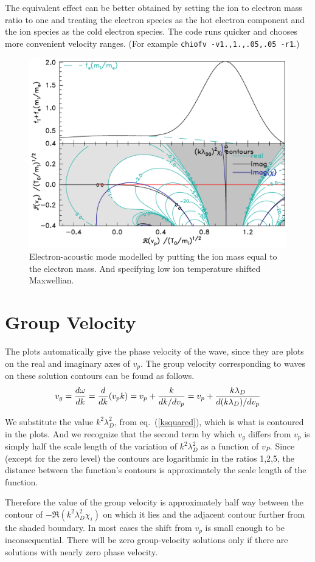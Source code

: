 \documentclass[12pt]{article}
\begin{document}
The equivalent effect can be better obtained by setting the ion to
electron mass ratio to one and treating the electron species as the
hot electron component and the ion species as the cold electron
species. The code runs quicker and chooses more convenient velocity
ranges. (For example \verb!chiofv -v1.,1.,.05,.05 -r1!.)

\begin{figure}[htp]
  \centering
  \includegraphics[width=.7\hsize]{eamode}
  \caption{Electron-acoustic mode modelled by putting the ion mass
    equal to the electron mass. And specifying low ion temperature
    shifted Maxwellian. }
  \label{fig:eamode}
\end{figure}

\section{Group Velocity}

The plots automatically give the phase velocity of the wave, since
they are plots on the real and imaginary axes of $v_p$. The group
velocity corresponding to waves on these solution contours can be
found as follows.
\begin{equation}
  \label{vgroup}
  v_g = {d\omega\over dk} = {d\over dk}(v_p k) = v_p + {k\over
    dk/dv_p} = v_p + {k\lambda_{D}\over d(k\lambda_{D})/dv_p}
\end{equation}

We substitute the value $k^2\lambda_{D}^2$, from eq.\
(\ref{ksquared}), which is what is contoured in the plots. And we
recognize that the second term by which $v_g$ differs from $v_p$ is
simply half the scale length of the variation of $k^2\lambda_{D}^2$ as
a function of $v_P$. Since (except for the zero level) the contours
are logarithmic in the ratios 1,2,5, the distance between the
function's contours is approximately the scale length of the function.


Therefore the value of the group velocity is approximately half way
between the contour of $-\Re (k^2\lambda_{D}^2 \chi_i)$ on which
it lies and the adjacent contour further from the shaded boundary. In
most cases the shift from $v_p$ is small enough to be inconsequential.
There will be zero group-velocity solutions only if there are
solutions with nearly zero phase velocity.
\end{document}
